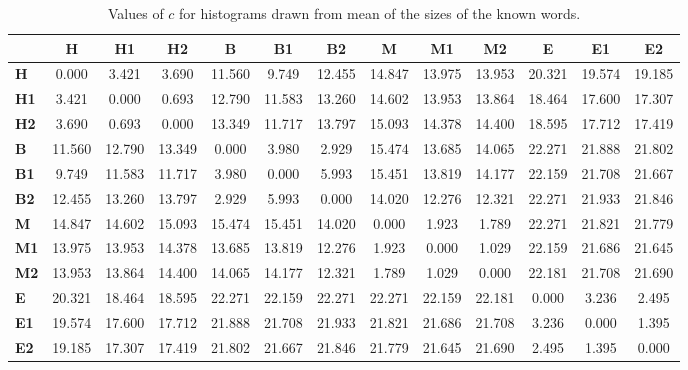 \begin{table*}[h!]
\begin{center}
\begin{tabular}{| l || c | c | c || c | c | c || c | c | c || c | c | c |}\hline
 & {\bf H} & {\bf H1} & {\bf H2} & {\bf B} & {\bf B1} & {\bf B2} & {\bf M} & {\bf M1} & {\bf M2} & {\bf E} & {\bf E1} & {\bf E2} \\\hline\hline
{\bf H} & 0.000 & 3.421 & 3.690 & 11.560 & 9.749 & 12.455 & 14.847 & 13.975 & 13.953 & 20.321 & 19.574 & 19.185 \\\hline
{\bf H1} & 3.421 & 0.000 & 0.693 & 12.790 & 11.583 & 13.260 & 14.602 & 13.953 & 13.864 & 18.464 & 17.600 & 17.307 \\\hline
{\bf H2} & 3.690 & 0.693 & 0.000 & 13.349 & 11.717 & 13.797 & 15.093 & 14.378 & 14.400 & 18.595 & 17.712 & 17.419 \\\hline\hline
{\bf B} & 11.560 & 12.790 & 13.349 & 0.000 & 3.980 & 2.929 & 15.474 & 13.685 & 14.065 & 22.271 & 21.888 & 21.802 \\\hline
{\bf B1} & 9.749 & 11.583 & 11.717 & 3.980 & 0.000 & 5.993 & 15.451 & 13.819 & 14.177 & 22.159 & 21.708 & 21.667 \\\hline
{\bf B2} & 12.455 & 13.260 & 13.797 & 2.929 & 5.993 & 0.000 & 14.020 & 12.276 & 12.321 & 22.271 & 21.933 & 21.846 \\\hline\hline
{\bf M} & 14.847 & 14.602 & 15.093 & 15.474 & 15.451 & 14.020 & 0.000 & 1.923 & 1.789 & 22.271 & 21.821 & 21.779 \\\hline
{\bf M1} & 13.975 & 13.953 & 14.378 & 13.685 & 13.819 & 12.276 & 1.923 & 0.000 & 1.029 & 22.159 & 21.686 & 21.645 \\\hline
{\bf M2} & 13.953 & 13.864 & 14.400 & 14.065 & 14.177 & 12.321 & 1.789 & 1.029 & 0.000 & 22.181 & 21.708 & 21.690 \\\hline\hline
{\bf E} & 20.321 & 18.464 & 18.595 & 22.271 & 22.159 & 22.271 & 22.271 & 22.159 & 22.181 & 0.000 & 3.236 & 2.495 \\\hline
{\bf E1} & 19.574 & 17.600 & 17.712 & 21.888 & 21.708 & 21.933 & 21.821 & 21.686 & 21.708 & 3.236 & 0.000 & 1.395 \\\hline
{\bf E2} & 19.185 & 17.307 & 17.419 & 21.802 & 21.667 & 21.846 & 21.779 & 21.645 & 21.690 & 2.495 & 1.395 & 0.000 \\\hline
\end{tabular}
\caption{Values of $c$ for histograms drawn from mean of the sizes of the known words.}
\end{center}
\end{table*}